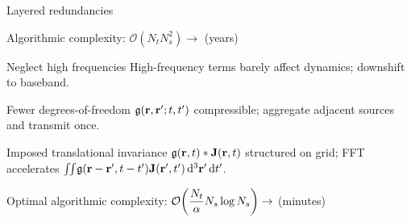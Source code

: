 \documentclass[aspectratio=169, usenames, dvipsnames]{beamer}
\begin{document}
\begin{frame}{Layered redundancies}
  \begin{center}
    Algorithmic complexity: $\displaystyle\mathcal{O}(N_t N_s^2) \to$ \alert{(years)}
  \end{center}
  \begin{block}{Neglect high frequencies}
    High-frequency terms barely affect dynamics; downshift to baseband.
  \end{block}
  \begin{block}{Fewer degrees-of-freedom}
    $\mathfrak{g}(\vb{r}, \vb{r}'; t, t')$ compressible; aggregate adjacent sources and transmit once.
  \end{block}
  \begin{block}{Imposed translational invariance}
    $\mathfrak{g}(\vb{r}, t) * \vb{J}(\vb{r}, t)$ structured on grid; FFT accelerates $\iint_{}\mathfrak{g}(\vb{r} - \vb{r}', t - t') \vb{J}(\vb{r'}, t') \dd[3]{\vb{r}'} \dd{t'}$.
  \end{block}
  \begin{center}
    Optimal algorithmic complexity: $\displaystyle\mathcal{O}\qty(\frac{N_t}{\alpha} N_s \log N_s) \to$ \alert{(minutes)}
  \end{center}
\end{frame}
\end{document}
